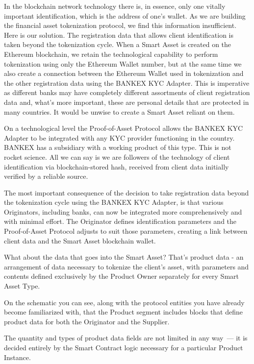 \documentclass{article}
\begin{document}
\begin{multicols}{2}
In the blockchain network technology there is, in essence, only one vitally important identification, which is the address of one's wallet. As we are building the financial asset tokenization protocol, we find this information insufficient. 
Here is our solution. The registration data that allows client identification is taken beyond the tokenization cycle. When a Smart Asset is created on the Ethereum blockchain, we retain the technological capability to perform tokenization using only the Ethereum Wallet number, but at the same time we also create a connection between the Ethereum Wallet used in tokenization and the other registration data using the BANKEX KYC Adapter. This is imperative as different banks may have completely different assortments of client registration data and, what’s more important, these are personal details that are protected in many countries. It would be unwise to create a Smart Asset reliant on them. 

On a technological level the Proof-of-Asset Protocol allows the BANKEX KYC Adapter to be integrated with any KYC provider functioning in the country. BANKEX has a subsidiary with a working product of this type. This is not rocket science. All we can say is we are followers of the technology of client identification via blockchain-stored hash, received from client data initially verified by a reliable source. 

The most important consequence of the decision to take registration data beyond the tokenization cycle using the BANKEX KYC Adapter, is that various Originators, including banks, can now be integrated more comprehensively and with minimal effort. The Originator defines identification parameters and the Proof-of-Asset Protocol adjusts to suit those parameters, creating a link between client data and the Smart Asset blockchain wallet. 

What about the data that goes into the Smart Asset? That's product data - an arrangement of data necessary to tokenize the client’s asset, with parameters and contents defined exclusively by the Product Owner separately for every Smart Asset Type. 

On the schematic you can see, along with the protocol entities you have already become familiarized with, that the Product segment includes blocks that define product data for both the Originator and the Supplier.

The quantity and types of product data fields are not limited in any way~--- it is decided entirely by the Smart Contract logic necessary for a particular Product Instance. 


\end{multicols}
\end{document}

